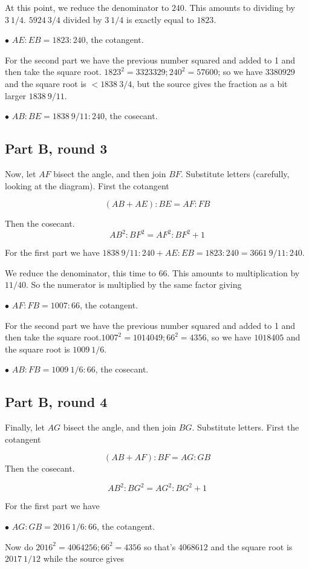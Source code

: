 \documentclass[11pt, oneside]{article}
\begin{document}
At this point, we reduce the denominator to $240$.  This amounts to dividing by $3 \ 1/4$.  $5924 \ 3/4$ divided by $3 \ 1/4$ is exactly equal to $1823$.

$\bullet$ $AE:EB = 1823:240$, the cotangent.

For the second part we have the previous number squared and added to 1 and then take the square root.
$1823^2 = 3323329;  240^2 = 57600$;  so we have $3380929$ and the square root is $< 1838 \ 3/4$, but the source gives the fraction as a bit larger $1838 \ 9/11$.

$\bullet$ $AB:BE = 1838 \ 9/11: 240$, the cosecant.

\subsection*{Part B, round 3}
Now, let $AF$ bisect the angle, and then join $BF$.  Substitute letters (carefully, looking at the diagram).  First the cotangent

\[ (AB + AE):BE = AF:FB \]

Then the cosecant.
\[ AB^2:BF^2 = AF^2:BF^2 + 1 \]

For the first part we have $1838 \ 9/11: 240 + AE:EB = 1823:240 = 3661 \ 9/11:240$. 

 We reduce the denominator, this time to $66$.  This amounts to multiplication by $11/40$.  So the numerator is multiplied by the same factor giving

$\bullet$ $AF:FB = 1007:66$, the cotangent.

For the second part we have the previous number squared and added to 1 and then take the square root.$1007^2 = 1014049;  66^2 = 4356$, so we have $1018405$ and the square root is $1009 \ 1/6$.

$\bullet$ $AB:FB = 1009 \ 1/6:66$, the cosecant.

\subsection*{Part B, round 4}
Finally, let $AG$ bisect the angle, and then join $BG$.  Substitute letters.  First the cotangent

\[ (AB + AF):BF = AG:GB \]
Then the cosecant.

\[ AB^2:BG^2 = AG^2:BG^2 + 1 \]

For the first part we have

$\bullet$ $AG:GB = 2016 \ 1/6:66$, the cotangent.

Now do $2016^2 = 4064256;  66^2 = 4356$ so that's $4068612$ and the square root is $2017 \ 1/12$ while the source gives
\end{document}
